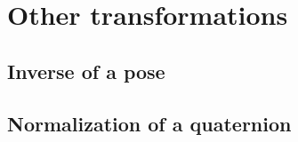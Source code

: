 \documentclass[a4paper,10pt]{report}
\begin{document}
\chapter{Other transformations}

\section{Inverse of a pose}


\section{Normalization of a quaternion}
\label{sect:quat:norm}





\end{document}
